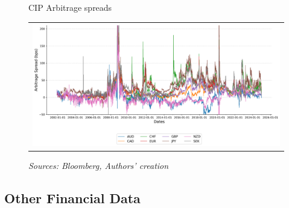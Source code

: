 \documentclass{article}
\begin{document}
\begin{figure}[h!]
    \centering
    \caption{CIP Arbitrage spreads}
  \begin{tabular}{@{}c@{}}
    \includegraphics[width=.7\linewidth]{../docs_src/CIP_replicate.png}
  \end{tabular}
  \caption*{\emph{Sources: Bloomberg, Authors' creation}}
  \label{fig:cip_basis}
\end{figure}




\subsection{Other Financial Data}
\end{document}
